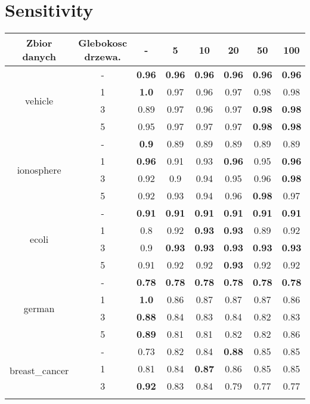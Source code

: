 \documentclass{article}%
\begin{document}
\section*{Sensitivity}%
\begin{longtable}{c|c|cccccc}%
\hline%
Zbior danych&Glebokosc drzewa.&{-}&5&10&20&50&100\\%
\hline%
\multirow{4}{*}{vehicle}&{-}&\textbf{0.96}&\textbf{0.96}&\textbf{0.96}&\textbf{0.96}&\textbf{0.96}&\textbf{0.96}\\%
\cline{2%
-%
8}%
&1&\textbf{1.0}&0.97&0.96&0.97&0.98&0.98\\%
\cline{2%
-%
8}%
&3&0.89&0.97&0.96&0.97&\textbf{0.98}&\textbf{0.98}\\%
\cline{2%
-%
8}%
&5&0.95&0.97&0.97&0.97&\textbf{0.98}&\textbf{0.98}\\%
\hline%
\multirow{4}{*}{ionosphere}&{-}&\textbf{0.9}&0.89&0.89&0.89&0.89&0.89\\%
\cline{2%
-%
8}%
&1&\textbf{0.96}&0.91&0.93&\textbf{0.96}&0.95&\textbf{0.96}\\%
\cline{2%
-%
8}%
&3&0.92&0.9&0.94&0.95&0.96&\textbf{0.98}\\%
\cline{2%
-%
8}%
&5&0.92&0.93&0.94&0.96&\textbf{0.98}&0.97\\%
\hline%
\multirow{4}{*}{ecoli}&{-}&\textbf{0.91}&\textbf{0.91}&\textbf{0.91}&\textbf{0.91}&\textbf{0.91}&\textbf{0.91}\\%
\cline{2%
-%
8}%
&1&0.8&0.92&\textbf{0.93}&\textbf{0.93}&0.89&0.92\\%
\cline{2%
-%
8}%
&3&0.9&\textbf{0.93}&\textbf{0.93}&\textbf{0.93}&\textbf{0.93}&\textbf{0.93}\\%
\cline{2%
-%
8}%
&5&0.91&0.92&0.92&\textbf{0.93}&0.92&0.92\\%
\hline%
\multirow{4}{*}{german}&{-}&\textbf{0.78}&\textbf{0.78}&\textbf{0.78}&\textbf{0.78}&\textbf{0.78}&\textbf{0.78}\\%
\cline{2%
-%
8}%
&1&\textbf{1.0}&0.86&0.87&0.87&0.87&0.86\\%
\cline{2%
-%
8}%
&3&\textbf{0.88}&0.84&0.83&0.84&0.82&0.83\\%
\cline{2%
-%
8}%
&5&\textbf{0.89}&0.81&0.81&0.82&0.82&0.86\\%
\hline%
\multirow{4}{*}{breast\_cancer}&{-}&0.73&0.82&0.84&\textbf{0.88}&0.85&0.85\\%
\cline{2%
-%
8}%
&1&0.81&0.84&\textbf{0.87}&0.86&0.85&0.85\\%
\cline{2%
-%
8}%
&3&\textbf{0.92}&0.83&0.84&0.79&0.77&0.77\\%
\cline{2%
}
\end{longtable}
\end{document}
